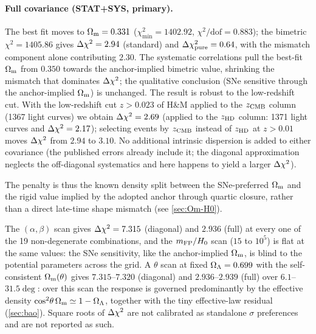 \paragraph{Full covariance (STAT+SYS, primary).} The \LCDM{} best fit moves to $\Omega_{\mathrm m}=0.331$ ($\chi^2_{\min}=1402.92$, $\chi^2/\mathrm{dof}=0.883$); the bimetric $\chi^2=1405.86$ gives $\Delta\chi^2=2.94$ (standard) and $\Delta\chi^2_{\rm pure}=0.64$, with the mismatch component alone contributing $2.30$. The systematic correlations pull the \LCDM{} best-fit $\Omega_{\mathrm m}$ from $0.350$ towards the anchor-implied bimetric value, shrinking the mismatch that dominates $\Delta\chi^2$; the qualitative conclusion (SNe sensitive through the anchor-implied $\Omega_{\mathrm m}$) is unchanged.
The result is robust to the low-redshift cut. With the low-redshift cut $z>0.023$ of H\&M applied to the $z_{\rm CMB}$ column (1367 light curves) we obtain $\Delta\chi^2=2.69$ (applied to the $z_{\rm HD}$ column: 1371 light curves and $\Delta\chi^2=2.17$); selecting events by $z_{\rm CMB}$ instead of $z_{\rm HD}$ at $z>0.01$ moves $\Delta\chi^2$ from $2.94$ to $3.10$. No additional intrinsic dispersion is added to either covariance (the published errors already include it; the diagonal approximation neglects the off-diagonal systematics and here happens to yield a larger $\Delta\chi^2$).

The penalty is thus the known density split between the SNe-preferred $\Omega_{\mathrm m}$ and the rigid value implied by the adopted anchor through quartic closure, rather than a direct late-time shape mismatch (see \cref{sec:Om-H0}).

The $(\alpha,\beta)$ scan gives $\Delta\chi^2=7.315$ (diagonal) and $2.936$ (full) at every one of the 19 non-degenerate combinations, and the $m_{\mathrm{FP}}/H_0$ scan ($15$ to $10^5$) is flat at the same values: the SNe sensitivity, like the anchor-implied $\Omega_{\mathrm m}$, is blind to the potential parameters across the grid. A $\theta$ scan at fixed $\Omega_{\Lambda}=0.699$ with the self-consistent $\Omega_{\mathrm m}(\theta)$ gives $7.315$--$7.320$ (diagonal) and $2.936$--$2.939$ (full) over $6.1$--$31.5\deg$: over this scan the response is governed predominantly by the effective density $\cos^2\!\theta\,\Omega_{\mathrm m}\simeq1-\Omega_{\Lambda}$, together with the tiny effective-law residual (\cref{sec:bao}). Square roots of $\Delta\chi^2$ are not calibrated as standalone $\sigma$ preferences and are not reported as such.
